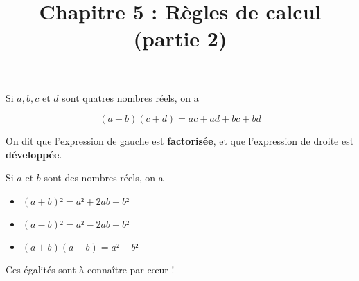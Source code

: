 \documentclass[
	classe=$2^{de}$
]{coursclass}
\title{Chapitre 5 : Règles de calcul (partie 2)}
\author{}
\date{}
\begin{document}
\maketitle

\begin{propriete}
	Si $a, b, c$ et $d$ sont quatres nombres réels, on a

	$$ (a + b)(c + d) = ac + ad + bc + bd $$

	On dit que l'expression de gauche est \textbf{factorisée}, et que l'expression de droite est \textbf{développée}.
\end{propriete}

\begin{propriete}
	Si $a$ et $b$ sont des nombres réels, on a
	\begin{itemize}
		\item $(a + b)² = a² + 2ab + b²$
		\item $(a - b)² = a² - 2ab + b²$
		\item $(a + b)(a - b) = a² - b²$
	\end{itemize}

	Ces égalités sont à connaître par cœur !
\end{propriete}
\end{document}
